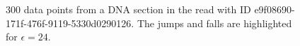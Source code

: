 \begin{figure}
\centering

\caption{\label{fig:epsilon-25}300 data points from a DNA section in the read with ID e9f08690-171f-476f-9119-5330d0290126. The jumps and falls are highlighted for $\epsilon=24$.}
\end{figure}
